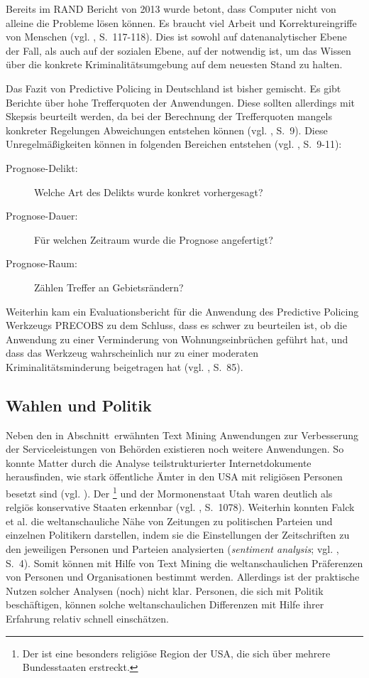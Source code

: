 Bereits im RAND Bericht von 2013 wurde betont, dass Computer nicht von alleine die Probleme
lösen können. Es braucht viel Arbeit und Korrektureingriffe von Menschen (vgl. \cite{Perry}, S.~117-118). 
Dies ist sowohl auf datenanalytischer Ebene der Fall, als auch auf der sozialen Ebene, auf der
\grqq{} notwendig ist, um das Wissen über die konkrete Kriminalitätsumgebung auf dem
neuesten Stand zu halten. 

Das Fazit von Predictive Policing in Deutschland ist bisher gemischt. Es gibt Berichte über hohe
Trefferquoten der Anwendungen. Diese sollten allerdings mit Skepsis beurteilt
werden, da bei der Berechnung der Trefferquoten mangels konkreter Regelungen Abweichungen
entstehen können (vgl. \cite{Bode}, S.~9).
Diese Unregelmäßigkeiten können in folgenden Bereichen entstehen (vgl. \cite{Bode}, S.~9-11):

\begin{description}
\item[Prognose-Delikt:] Welche Art des Delikts wurde konkret vorhergesagt?
\item[Prognose-Dauer:] Für welchen Zeitraum wurde die Prognose angefertigt?
\item[Prognose-Raum:] Zählen Treffer an Gebietsrändern?
\end{description}

Weiterhin kam ein Evaluationsbericht für die Anwendung des Predictive Policing Werkzeugs PRECOBS
zu dem Schluss, dass es schwer zu beurteilen ist, ob die Anwendung zu einer Verminderung von
Wohnungseinbrüchen geführt hat, und dass das Werkzeug wahrscheinlich nur zu einer moderaten Kriminalitätsminderung
beigetragen hat (vgl. \cite{Gerstner}, S.~85).  

\subsection{Wahlen und Politik}

Neben den in Abschnitt~\xcom erwähnten Text Mining Anwendungen zur Verbesserung der Serviceleistungen
von Behörden existieren noch weitere \grqq{} Anwendungen. So konnte Matter durch
die Analyse teilstrukturierter Internetdokumente herausfinden, wie stark öffentliche Ämter in den USA
mit religiösen Personen besetzt sind (vgl. \cite{Matter}). Der \grqq{}\footnote{
Der  ist eine besonders religiöse Region der USA, die sich über mehrere Bundesstaaten erstreckt.
} und der Mormonenstaat Utah waren deutlich als relgiös konservative Staaten erkennbar (vgl. \cite{Matter}, S.~1078).
Weiterhin konnten Falck et al. die weltanschauliche Nähe von Zeitungen zu politischen Parteien und einzelnen Politikern
darstellen, indem sie die Einstellungen der Zeitschriften zu den jeweiligen Personen und Parteien analysierten
(\emph{sentiment analysis}; vgl. \cite{Falck}, S.~4). Somit können mit Hilfe von Text Mining die weltanschaulichen Präferenzen
von Personen und Organisationen bestimmt werden. Allerdings ist der praktische Nutzen solcher Analysen (noch) nicht klar.
Personen, die sich mit Politik beschäftigen, können solche weltanschaulichen Differenzen mit Hilfe ihrer Erfahrung relativ
schnell einschätzen.

